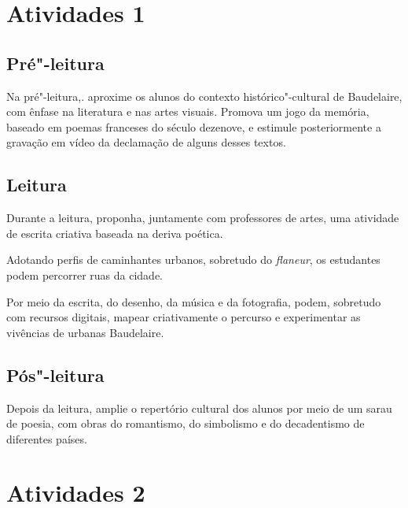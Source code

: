 \documentclass[12pt]{extarticle}
\begin{document}
\tableofcontents

\section{Atividades 1}


\subsection{Pré"-leitura}


Na pré"-leitura,. aproxime os alunos do contexto
histórico"-cultural de Baudelaire, com ênfase na literatura e nas artes
visuais.
Promova um jogo da memória, baseado em poemas franceses do século
dezenove, e estimule posteriormente a gravação em vídeo da declamação
de alguns desses textos.

\subsection{Leitura}


Durante a leitura, proponha, juntamente com professores de
artes, uma atividade de escrita criativa baseada na deriva poética.

Adotando perfis de caminhantes urbanos, sobretudo do \textit{flaneur}, os
estudantes podem percorrer ruas da cidade.

Por meio da escrita, do desenho, da música e da fotografia, podem,
sobretudo com recursos digitais, mapear criativamente o percurso e
experimentar as vivências de urbanas Baudelaire.

\subsection{Pós"-leitura}


Depois da leitura, amplie o repertório cultural dos alunos
por meio de um sarau de poesia, com obras do romantismo, do simbolismo
e do decadentismo de diferentes países.


\section{Atividades 2}
\end{document}
